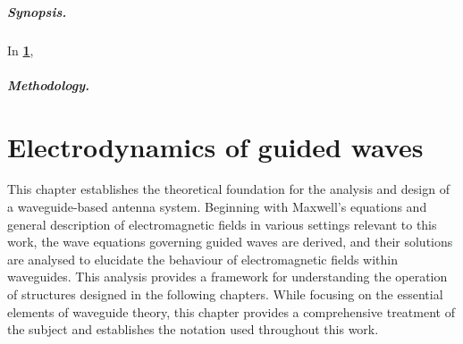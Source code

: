 \documentclass[11pt,a4paper,twoside,openany]{report}
\begin{document}


\paragraph*{Synopsis.} In \textbf{\cref{chapter:electrodynamics}}, \lipsum[4]

\paragraph*{Methodology.} \lipsum[4]


\chapter{Electrodynamics of guided waves}
\label{chapter:electrodynamics}
This chapter establishes the theoretical foundation for the analysis and design of a waveguide-based antenna system. Beginning with Maxwell's equations and general description of electromagnetic fields in various settings relevant to this work, the wave equations governing guided waves are derived, and their solutions are analysed to elucidate the behaviour of electromagnetic fields within waveguides. This analysis provides a framework for understanding the operation of structures designed in the following chapters. While focusing on the essential elements of waveguide theory, this chapter provides a comprehensive treatment of the subject and establishes the notation used throughout this work.
\end{document}
